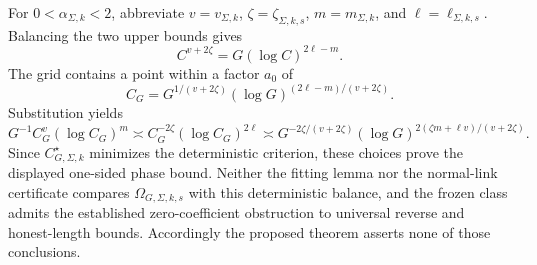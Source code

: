 For \(0<\alpha_{\Sigma,k}<2\), abbreviate \(v=v_{\Sigma,k}\), \(\zeta=\zeta_{\Sigma,k,s}\), \(m=m_{\Sigma,k}\), and \(\ell=\ell_{\Sigma,k,s}\). Balancing the two upper bounds gives
\[
C^{v+2\zeta}=G(\log C)^{2\ell-m}.
\]
The grid contains a point within a factor \(a_0\) of
\[
C_G=G^{1/(v+2\zeta)}(\log G)^{(2\ell-m)/(v+2\zeta)}.
\]
Substitution yields
\[
G^{-1}C_G^v(\log C_G)^m
\asymp C_G^{-2\zeta}(\log C_G)^{2\ell}
\asymp
G^{-2\zeta/(v+2\zeta)}
(\log G)^{2(\zeta m+\ell v)/(v+2\zeta)}.
\]
Since \(C_{G,\Sigma,k}^{\star}\) minimizes the deterministic criterion, these choices prove the displayed one-sided phase bound. Neither the fitting lemma nor the normal-link certificate compares \(\Omega_{G,\Sigma,k,s}\) with this deterministic balance, and the frozen class admits the established zero-coefficient obstruction to universal reverse and honest-length bounds. Accordingly the proposed theorem asserts none of those conclusions.
